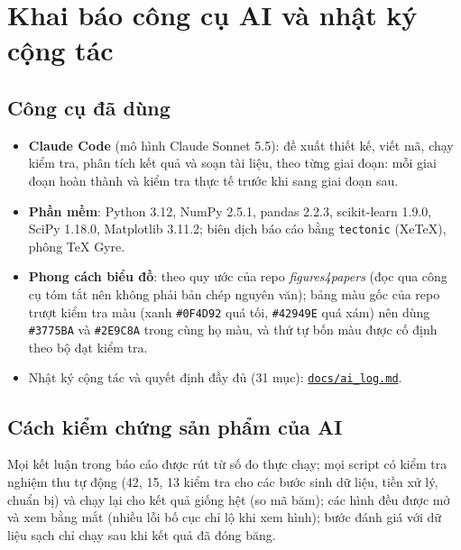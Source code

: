 \section{Khai báo công cụ AI và nhật ký cộng tác}
\label{app:ai}

\subsection{Công cụ đã dùng}
\begin{itemize}
\item \textbf{Claude Code} (mô hình Claude Sonnet 5.5): đề xuất thiết kế, viết mã, chạy kiểm tra, phân tích kết quả và soạn tài liệu, theo từng giai đoạn: mỗi giai đoạn hoàn thành và kiểm tra thực tế trước khi sang giai đoạn sau.
\item \textbf{Phần mềm}: Python 3.12, NumPy 2.5.1, pandas 2.2.3, scikit-learn 1.9.0, SciPy 1.18.0, Matplotlib 3.11.2; biên dịch báo cáo bằng \texttt{tectonic} (XeTeX), phông TeX Gyre.
\item \textbf{Phong cách biểu đồ}: theo quy ước của repo \emph{figures4papers} (đọc qua công cụ tóm tắt nên không phải bản chép nguyên văn); bảng màu gốc của repo trượt kiểm tra màu (xanh \texttt{\#0F4D92} quá tối, \texttt{\#42949E} quá xám) nên dùng \texttt{\#3775BA} và \texttt{\#2E9C8A} trong cùng họ màu, và thứ tự bốn màu được cố định theo bộ đạt kiểm tra.
\item Nhật ký cộng tác và quyết định đầy đủ (31 mục): \href{https://github.com/quanai06/midterm_datamining/blob/main/docs/ai_log.md}{\texttt{docs/ai\_log.md}}.
\end{itemize}

\subsection{Cách kiểm chứng sản phẩm của AI}
Mọi kết luận trong báo cáo được rút từ số đo thực chạy; mọi script có kiểm tra nghiệm thu tự động (42, 15, 13 kiểm tra cho các bước sinh dữ liệu, tiền xử lý, chuẩn bị) và chạy lại cho kết quả giống hệt (so mã băm); các hình đều được mở và xem bằng mắt (nhiều lỗi bố cục chỉ lộ khi xem hình);
bước đánh giá với dữ liệu sạch chỉ chạy sau khi kết quả đã đóng băng.

